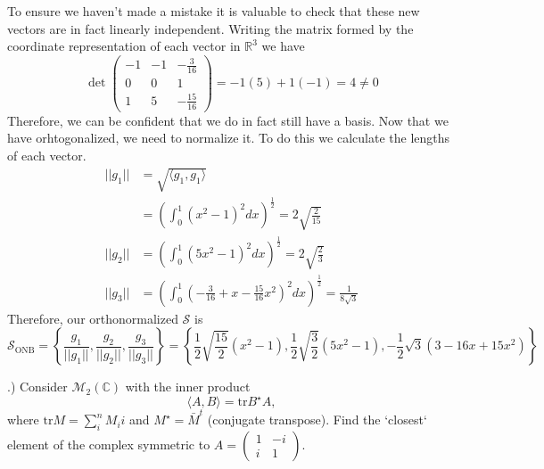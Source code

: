 \documentclass[a4paper, 11pt]{article}
\newcommand{\R}{\mathbb{R}}
\newcommand{\C}{\mathbb{C}}
\newenvironment{solution}{%
	\begin{list}{}{%
			\setlength{\topsep}{0pt}%
			\setlength{\leftmargin}{1.5cm}%
			\setlength{\rightmargin}{1.5cm}%
			\setlength{\listparindent}{\parindent}%
			\setlength{\itemindent}{\parindent}%
			\setlength{\parsep}{\parskip}%
		}%
		\item[]}{\end{list}}
\begin{document}
\begin{solution}
  \noindent To ensure we haven't made a mistake it is valuable to check that these new vectors are in fact linearly independent. Writing the matrix formed by the coordinate representation of each vector in $\R^3$ we have
  \begin{equation*}
    \det\begin{pmatrix}
    -1 & -1 & -\frac{3}{16} \\
    0 & 0 & 1 \\
    1 & 5 & -\frac{15}{16}
    \end{pmatrix} = -1(5)+1(-1) = 4 \neq 0
  \end{equation*}
  Therefore, we can be confident that we do in fact still have a basis. Now that we have orhtogonalized, we need to normalize it. To do this we calculate the lengths of each vector.
  \begin{align*}
    ||g_1|| &= \sqrt{\langle g_1, g_1 \rangle} \\
    &= \left( \int_0^1(x^2-1)^2dx\right)^{\frac{1}{2}} = 2\sqrt{\frac{2}{15}}\\
    ||g_2|| &= \left(\int_0^1(5x^2-1)^2dx \right)^{\frac{1}{2}} = 2\sqrt{\frac{2}{3}}\\
    ||g_3|| &= \left( \int_0^1\left( -\frac{3}{16}+x-\frac{15}{16}x^2   \right)^2dx  \right)^{\frac{1}{2}} = \frac{1}{8\sqrt{3}} 
  \end{align*}
  Therefore, our orthonormalized $\mathcal{S}$ is
  \begin{equation*}
    \mathcal{S}_\text{ONB} = \left\{ \frac{g_1}{||g_1||}, \frac{g_2}{||g_2||},  \frac{g_3}{||g_3||}  \right\} = \left\{ \frac{1}{2}\sqrt{\frac{15}{2}}(x^2-1), \frac{1}{2}\sqrt{\frac{3}{2}}(5x^2-1), -\frac{1}{2}\sqrt{3}(3-16x+15x^2)\right\}
  \end{equation*}
\end{solution}


.) Consider $\mathcal{M}_2(\C)$ with the inner product
\begin{equation*}
  \langle A, B \rangle = \text{tr}B^\star A,
\end{equation*}
where $\text{tr} M = \sum_i^n M_ii$ and $M^\star = \bar{M}^t$ (conjugate transpose). Find the `closest` element of the complex symmetric to $A=\begin{pmatrix} 1 & -i \\ i & 1 \end{pmatrix}$. \\
\end{document}
